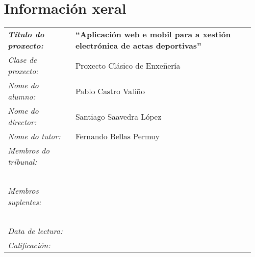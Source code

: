 \thispagestyle{empty}
\section*{Información xeral}
\vfill
\begin{center}
\begin{tabular}{p{4.5cm}p{9cm}}
\textbf{\emph{Título do proxecto:}} & \textbf{``Aplicación web e mobil para a xestión 
electrónica de actas deportivas''} \\[0.5cm]
\emph{Clase de proxecto:} & Proxecto Clásico de Enxeñería \\[0.5cm]
\emph{Nome do alumno:} & Pablo Castro Valiño \\[0.5cm]
\emph{Nome do director:} & Santiago Saavedra López \\[0.5cm]
\emph{Nome do tutor:} & Fernando Bellas Permuy \\[0.5cm]
\emph{Membros do tribunal:} & \\[0.5cm]
& \\
& \\
& \\
& \\
& \\
\emph{Membros suplentes:} & \\[0.5cm]
& \\
& \\
& \\
& \\
& \\
\emph{Data de lectura:} & \\[0.5cm]
\emph{Calificación:} & \\
\end{tabular}
\end{center}
\vfill
